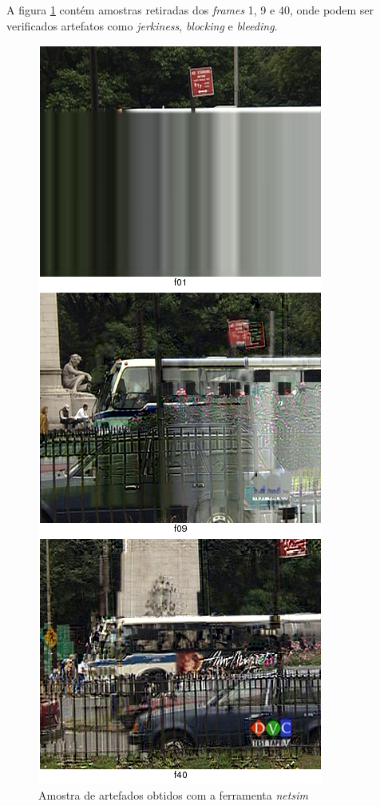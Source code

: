 A figura \ref{fig:netsim} contém amostras retiradas dos \emph{frames} 1, 9 e 40, onde podem ser verificados artefatos como \emph{jerkiness}, \emph{blocking} e \emph{bleeding}.

\begin{figure}[!htb]
	\centering
	\includegraphics[height=0.9\textheight]{./imgs/netsimresult.png}
	\caption{Amostra de artefados obtidos com a ferramenta \emph{netsim}}
	\label{fig:netsim}
\end{figure}

